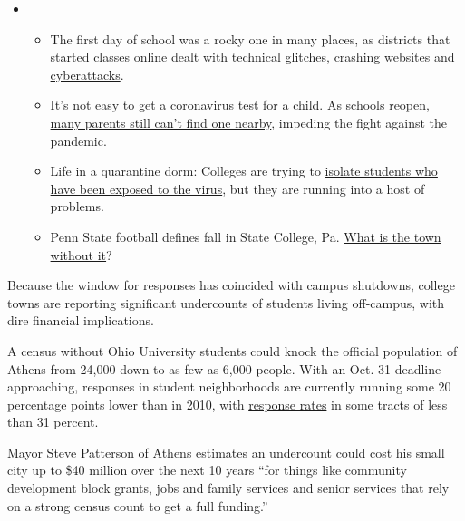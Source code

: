 \begin{itemize}
\item
  \begin{itemize}
  \tightlist
  \item
    The first day of school was a rocky one in many places, as districts
    that started classes online dealt with
    \href{https://www.nytimes3xbfgragh.onion/2020/09/08/us/school-districts-cyberattacks-glitches.html?action=click\&pgtype=Article\&state=default\&region=MAIN_CONTENT_3\&context=storylines_keepup}{technical
    glitches, crashing websites and cyberattacks}.
  \item
    It's not easy to get a coronavirus test for a child. As schools
    reopen,
    \href{https://www.nytimes3xbfgragh.onion/2020/09/08/upshot/children-testing-shortfalls-virus.html?action=click\&pgtype=Article\&state=default\&region=MAIN_CONTENT_3\&context=storylines_keepup}{many
    parents still can't find one nearby}, impeding the fight against the
    pandemic.
  \item
    Life in a quarantine dorm: Colleges are trying to
    \href{https://www.nytimes3xbfgragh.onion/2020/09/09/business/colleges-coronavirus-dormitories-quarantine.html?action=click\&pgtype=Article\&state=default\&region=MAIN_CONTENT_3\&context=storylines_keepup}{isolate
    students who have been exposed to the virus}, but they are running
    into a host of problems.
  \item
    Penn State football defines fall in State College, Pa.
    \href{https://www.nytimes3xbfgragh.onion/2020/09/09/sports/penn-state-college-football-canceled.html?action=click\&pgtype=Article\&state=default\&region=MAIN_CONTENT_3\&context=storylines_keepup}{What
    is the town without it}?
  \end{itemize}
\end{itemize}

Because the window for responses has coincided with campus shutdowns,
college towns are reporting significant undercounts of students living
off-campus, with dire financial implications.

A census without Ohio University students could knock the official
population of Athens from 24,000 down to as few as 6,000 people. With an
Oct. 31 deadline approaching, responses in student neighborhoods are
currently running some 20 percentage points lower than in 2010, with
\href{https://2020census.gov/en/response-rates.html}{response rates} in
some tracts of less than 31 percent.

Mayor Steve Patterson of Athens estimates an undercount could cost his
small city up to \$40 million over the next 10 years ``for things like
community development block grants, jobs and family services and senior
services that rely on a strong census count to get a full funding.''

